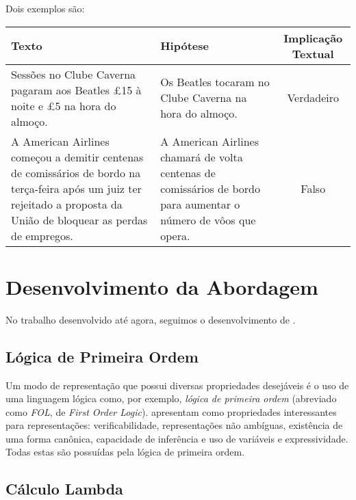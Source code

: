 \documentclass[12pt, a4paper, twoside]{article}
\begin{document}
Dois exemplos são:

\begin{center}
\begin{tabular}{|p{5cm}|p{5cm}|c|}
\hline Texto & Hipótese & Implicação Textual \\ 
\hline  Sessões no Clube Caverna pagaram aos Beatles £15 à noite e £5 na hora do almoço. & Os Beatles tocaram no Clube Caverna na hora do almoço. & Verdadeiro \\ 
\hline A American Airlines começou a demitir centenas de comissários de bordo na terça-feira após um juiz ter rejeitado a proposta da União de bloquear as perdas de empregos. & A American Airlines chamará de volta centenas de comissários de bordo para aumentar o número de vôos que opera. &  Falso \\
\hline
\end{tabular} 
\end{center}


\newpage
\section{Desenvolvimento da Abordagem}

No trabalho desenvolvido até agora, seguimos o desenvolvimento de \citet{BlackburnBos:2005}.

\subsection{Lógica de Primeira Ordem}
Um modo de representação que possui diversas propriedades desejáveis é o uso de uma linguagem lógica como, por exemplo, \textsl{lógica de primeira ordem} (abreviado como \textit{FOL}, de \textit{First Order Logic}). \citet{Jurafsky:2009} apresentam como propriedades interessantes para representações: verificabilidade, representações não ambíguas, existência de uma forma canônica, capacidade de inferência e uso de variáveis e expressividade. Todas estas são possuídas pela lógica de primeira ordem.


\subsection{Cálculo Lambda}
\end{document}
